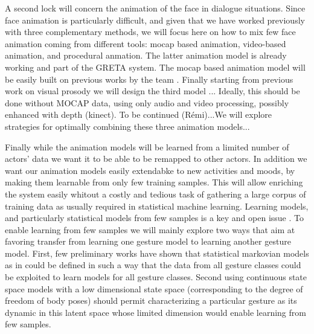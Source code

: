 
A second lock will concern the animation of the face in dialogue situations. Since face animation is particularly difficult, and given that we have worked previously with three complementary methods, we will focus here on how to mix few face animation coming from different tools: mocap based animation, video-based animation, and procedural anmation. 
The latter animation model is already working and part of the GRETA system. The mocap based animation model will be easily built on previous works by the team \cite{YuThesis}. 
Finally starting from previous work on visual prosody we will design the third model ... Ideally, this should be done without MOCAP data, using only audio and video processing, possibly enhanced with depth (kinect). To be continued (Rémi)...We will explore strategies for optimally combining these three animation models...

Finally while the animation models will be learned from a limited number of actors' data we want it to be able to be remapped to other actors. 
In addition we want our animation models easily extendabke to new activities and moods, by making them learnable from only few training samples. 
This  will allow enriching the system easily whitout a costly and tedious task of gathering a large corpus of training data as usually required in statistical machine learning. Learning models, and particularly statistical models from few samples is a key and open issue \cite{One shot, Zeroshot}. 
To enable learning from few samples we will mainly explore two ways that aim at favoring transfer from learning one
gesture model to learning another gesture model. 
First, few preliminary works have shown that statistical markovian models as in \cite{Ding2013} could be defined in such a way that the data from all gesture classes could be exploited to learn models for all gesture classes. 
Second using continuous state space models with a low dimensional state space
(corresponding to the degree of freedom of body poses) should permit characterizing a particular gesture as its dynamic
in this latent space whose limited dimension would enable learning from few samples.


